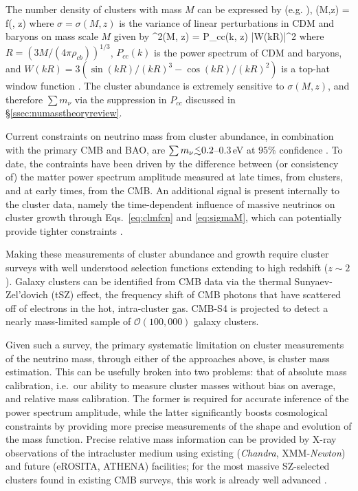 The number density of clusters with mass $M$ can be expressed by (e.g. \cite{Tinker:2008ff,Bhattacharya:2010wy}), 
\beq
\label{eq:clmfcn}
(M,z) =  f(\sigma, z)
\eeq
where $\sigma = \sigma(M,z)$ is the variance of linear perturbations in CDM and baryons on mass scale $M$ given by
\beq
\label{eq:sigmaM}
\sigma^2(M, z) = \int {}  P_{cc}(k, z) |W(kR)|^2
\eeq
where $R = (3M/(4\pi \rho_{cb}))^{1/3}$, $P_{cc}(k)$ is the power spectrum of CDM and baryons, and $W(kR) = 3(\sin(kR)/(kR)^3 - \cos(kR)/(kR)^2)$ is a top-hat window function \cite{Costanzi:2013bha,LoVerde:2014rxa}. The cluster abundance is extremely sensitive to $\sigma(M, z)$, and therefore $\sum m_\nu$ via the suppression in $P_{cc}$ discussed in \S\ref{ssec:numasstheoryreview}.

Current constraints on neutrino mass from cluster abundance, in combination with the primary CMB and BAO, are $\sum m_\nu \lsim 0.2$--$0.3$\,eV at $95\%$ confidence \cite{Hasselfield:2013wf,Mantz:2014paa,Ade:2015fva,deHaan:2016qvy}. To date, the contraints have been driven by the difference between (or consistency of) the matter power spectrum amplitude measured at late times, from clusters, and at early times, from the CMB. An additional signal is present internally to the cluster data, namely the time-dependent influence of massive neutrinos on cluster growth through Eqs.~\ref{eq:clmfcn} and \ref{eq:sigmaM}, which can potentially provide tighter constraints \cite{Wang:2005vr}.


Making these measurements of cluster abundance and growth require cluster surveys with well understood selection functions extending to high redshift ($z\sim2$). Galaxy clusters can be identified from CMB data via the thermal Sunyaev-Zel'dovich (tSZ) effect, the frequency shift of CMB photons that have scattered off of electrons in the hot, intra-cluster gas.  CMB-S4 is projected to detect a nearly mass-limited sample of $\mathcal{O}(100,000)$ galaxy clusters.

Given such a survey, the primary systematic limitation on cluster measurements of the neutrino mass, through either of the approaches above, is cluster mass estimation. This can be usefully broken into two problems: that of absolute mass calibration, i.e.\ our ability to measure cluster masses without bias on average, and relative mass calibration. The former is required for accurate inference of the power spectrum amplitude, while the latter significantly boosts cosmological constraints by providing more precise measurements of the shape and evolution of the mass function. Precise relative mass information can be provided by X-ray observations of the intracluster medium using existing ({\it Chandra}, XMM-{\it Newton}) and future (eROSITA, ATHENA) facilities; for the most massive SZ-selected clusters found in existing CMB surveys, this work is already well advanced \cite{deHaan:2016qvy, Andersson:2010vy}. 

